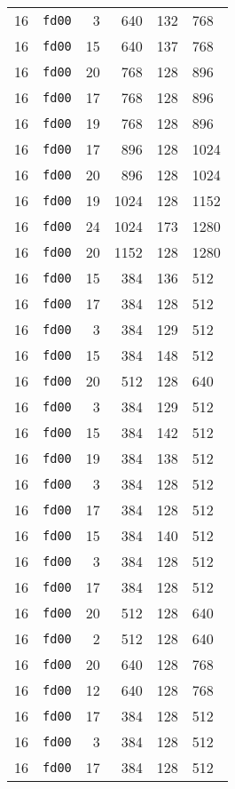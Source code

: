 \documentclass{article}
\begin{document}
\begin{table}[h!]
\begin{tabular}{llrrrl}
    16 & \texttt{fd00} & 3 & 640 & 132 & 768 \\
    16 & \texttt{fd00} & 15 & 640 & 137 & 768 \\
    16 & \texttt{fd00} & 20 & 768 & 128 & 896 \\
    16 & \texttt{fd00} & 17 & 768 & 128 & 896 \\
    16 & \texttt{fd00} & 19 & 768 & 128 & 896 \\
    16 & \texttt{fd00} & 17 & 896 & 128 & 1024 \\
    16 & \texttt{fd00} & 20 & 896 & 128 & 1024 \\
    16 & \texttt{fd00} & 19 & 1024 & 128 & 1152 \\
    16 & \texttt{fd00} & 24 & 1024 & 173 & 1280 \\
    16 & \texttt{fd00} & 20 & 1152 & 128 & 1280 \\
    16 & \texttt{fd00} & 15 & 384 & 136 & 512 \\
    16 & \texttt{fd00} & 17 & 384 & 128 & 512 \\
    16 & \texttt{fd00} & 3 & 384 & 129 & 512 \\
    16 & \texttt{fd00} & 15 & 384 & 148 & 512 \\
    16 & \texttt{fd00} & 20 & 512 & 128 & 640 \\
    16 & \texttt{fd00} & 3 & 384 & 129 & 512 \\
    16 & \texttt{fd00} & 15 & 384 & 142 & 512 \\
    16 & \texttt{fd00} & 19 & 384 & 138 & 512 \\
    16 & \texttt{fd00} & 3 & 384 & 128 & 512 \\
    16 & \texttt{fd00} & 17 & 384 & 128 & 512 \\
    16 & \texttt{fd00} & 15 & 384 & 140 & 512 \\
    16 & \texttt{fd00} & 3 & 384 & 128 & 512 \\
    16 & \texttt{fd00} & 17 & 384 & 128 & 512 \\
    16 & \texttt{fd00} & 20 & 512 & 128 & 640 \\
    16 & \texttt{fd00} & 2 & 512 & 128 & 640 \\
    16 & \texttt{fd00} & 20 & 640 & 128 & 768 \\
    16 & \texttt{fd00} & 12 & 640 & 128 & 768 \\
    16 & \texttt{fd00} & 17 & 384 & 128 & 512 \\
    16 & \texttt{fd00} & 3 & 384 & 128 & 512 \\
    16 & \texttt{fd00} & 17 & 384 & 128 & 512 \\

\end{tabular}
\end{table}
\end{document}

